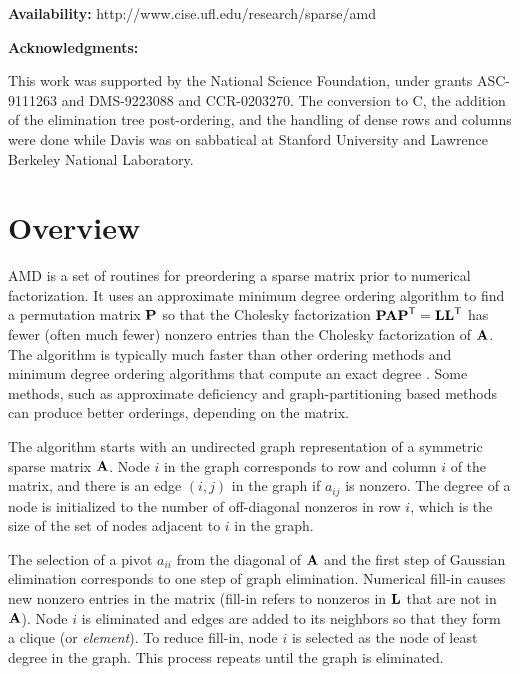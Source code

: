 \documentclass[11pt]{article}
\newcommand{\m}[1]{{\bf{#1}}}       %
\newcommand{\tr}{^{\sf T}}          %
\begin{document}
{\bf Availability:}
    http://www.cise.ufl.edu/research/sparse/amd

{\bf Acknowledgments:}

    This work was supported by the National Science Foundation, under
    grants ASC-9111263 and DMS-9223088 and CCR-0203270.
    The conversion to C, the addition of the elimination tree
    post-ordering, and the handling of dense rows and columns
    were done while Davis was on sabbatical at
    Stanford University and Lawrence Berkeley National Laboratory.

\newpage
\section{Overview}

AMD is a set of routines for preordering a sparse matrix prior to
numerical factorization.  It uses an approximate minimum degree ordering
algorithm \cite{AmestoyDavisDuff96} to find a permutation matrix $\m{P}$
so that the Cholesky factorization $\m{PAP}\tr=\m{LL}\tr$ has fewer
(often much fewer) nonzero entries than the Cholesky factorization of $\m{A}$.
The algorithm is typically much faster than other ordering methods
and  minimum degree ordering
algorithms that compute an exact degree \cite{GeorgeLiu89}.
Some methods, such as approximate deficiency
\cite{RothbergEisenstat98} and graph-partitioning based methods
\cite{Chaco,KarypisKumar98e,PellegriniRomanAmestoy00,schu:01}
can produce better orderings, depending on the matrix.

The algorithm starts with an undirected graph representation of a
symmetric sparse matrix $\m{A}$.  Node $i$ in the graph corresponds to row
and column $i$ of the matrix, and there is an edge $(i,j)$ in the graph if
$a_{ij}$ is nonzero.
The degree of a node is initialized to the number of off-diagonal nonzeros
in row $i$, which is the size of the set of nodes
adjacent to $i$ in the graph.

The selection of a pivot $a_{ii}$ from the diagonal of $\m{A}$ and the first
step of Gaussian elimination corresponds to one step of graph elimination.
Numerical fill-in causes new nonzero entries in the matrix
(fill-in refers to
nonzeros in $\m{L}$ that are not in $\m{A}$).
Node $i$ is eliminated and edges are added to its neighbors
so that they form a clique (or {\em element}).  To reduce fill-in,
node $i$ is selected as the node of least degree in the graph.
This process repeats until the graph is eliminated.
\end{document}

